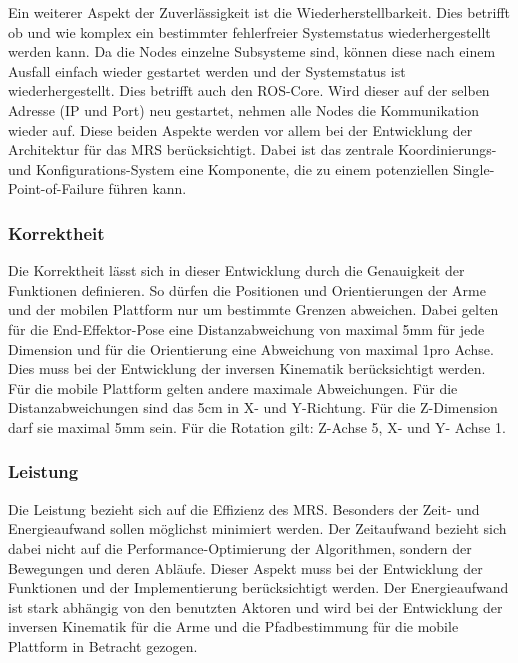 Ein weiterer Aspekt der Zuverlässigkeit ist die Wiederherstellbarkeit. Dies betrifft ob und wie komplex ein bestimmter fehlerfreier Systemstatus wiederhergestellt werden kann. Da die Nodes einzelne Subsysteme sind, können diese nach einem Ausfall einfach wieder gestartet werden und der Systemstatus ist wiederhergestellt. Dies betrifft auch den ROS-Core. Wird dieser auf der selben Adresse (IP und Port) neu gestartet, nehmen alle Nodes die Kommunikation wieder auf. Diese beiden Aspekte werden vor allem bei der Entwicklung der Architektur für das MRS berücksichtigt. Dabei ist das zentrale Koordinierungs- und Konfigurations-System eine Komponente, die zu einem potenziellen Single-Point-of-Failure führen kann.


\subsubsection{Korrektheit}
Die Korrektheit lässt sich in dieser Entwicklung durch die Genauigkeit der Funktionen definieren. So dürfen die Positionen und Orientierungen der Arme und der mobilen Plattform nur um bestimmte Grenzen abweichen. Dabei gelten für die End-Effektor-Pose eine Distanzabweichung von maximal 5mm für jede Dimension und für die Orientierung eine Abweichung von maximal 1\textdegree pro Achse. Dies muss bei der Entwicklung der inversen Kinematik berücksichtigt werden. Für die mobile Plattform gelten andere maximale Abweichungen. Für die Distanzabweichungen sind das 5cm in X- und Y-Richtung. Für die Z-Dimension darf sie maximal 5mm sein. Für die Rotation gilt: Z-Achse 5\textdegree, X- und Y- Achse 1\textdegree.

\subsubsection{Leistung}
Die Leistung bezieht sich auf die Effizienz des MRS. Besonders der Zeit- und Energieaufwand sollen möglichst minimiert werden. Der Zeitaufwand bezieht sich dabei nicht auf die Performance-Optimierung der Algorithmen, sondern der Bewegungen und deren Abläufe. Dieser Aspekt muss bei der Entwicklung der Funktionen und der Implementierung berücksichtigt werden. Der Energieaufwand ist stark abhängig von den benutzten Aktoren und wird bei der Entwicklung der inversen Kinematik für die Arme und die Pfadbestimmung für die mobile Plattform in Betracht gezogen.

